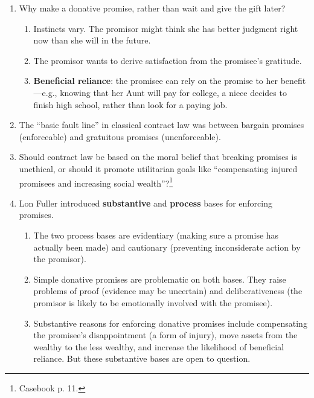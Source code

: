 \begin{enumerate}
    \item Why make a donative promise, rather than wait and give the gift 
    later?
    \begin{enumerate}
        \item Instincts vary. The promisor might think she has better judgment 
        right now than she will in the future.
        \item The promisor wants to derive satisfaction from the promisee's 
        gratitude.
        \item \textbf{Beneficial reliance}: the promisee can rely on the 
        promise to her benefit---e.g., knowing that her Aunt will pay for 
        college, a niece decides to finish high school, rather than look for a 
        paying job.
    \end{enumerate}
    \item The ``basic fault line'' in classical contract law was between 
    bargain promises (enforceable) and gratuitous promises (unenforceable).
    \item Should contract law be based on the moral belief that breaking 
    promises is unethical, or should it promote utilitarian goals like 
    ``compensating injured promisees and increasing social 
    wealth''?\footnote{Casebook p. 11.}
    \item Lon Fuller introduced \textbf{substantive} and \textbf{process} 
    bases for enforcing promises.
    \begin{enumerate}
        \item The two process bases are evidentiary (making sure a promise 
        has actually been made) and cautionary (preventing inconsiderate 
        action by the promisor).
        \item Simple donative promises are problematic on both bases. They 
        raise problems of proof (evidence may be uncertain) and 
        deliberativeness (the promisor is likely to be emotionally involved 
        with the promisee).
        \item Substantive reasons for enforcing donative promises include 
        compensating the promisee's disappointment (a form of injury), move 
        assets from the wealthy to the less wealthy, and increase the 
        likelihood of beneficial reliance. But these substantive bases are 
        open to question.
    \end{enumerate}
\end{enumerate}

